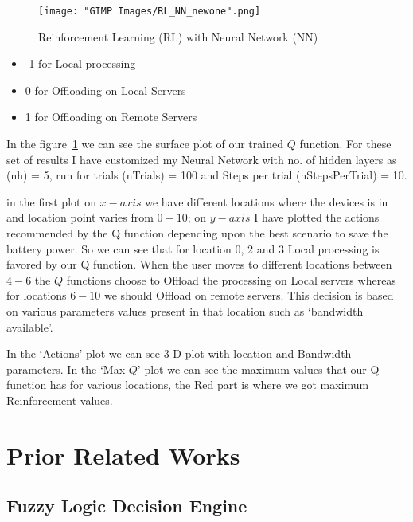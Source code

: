 \documentclass{report}
\begin{document}
\begin{figure}[h!]
  \centering
  \texttt{[image: "GIMP Images/RL\_NN\_newone".png]}
  \caption{Reinforcement Learning (RL) with Neural Network (NN)}
  \label{fig:RL_NN}
\end{figure}


\begin{itemize}
   \item -1 for Local processing
   \item 0 for Offloading on Local Servers
   \item 1 for Offloading on Remote Servers
\end{itemize}      



In the figure~\ref{fig:RL_NN} we can see the surface plot of our trained $Q$ function. For these set of results I have customized my Neural Network with no. of hidden layers as (nh) = 5, run for trials (nTrials) = 100 and Steps per trial (nStepsPerTrial) = 10. \par

in the first plot on $x-axis$ we have different locations where the devices is in and location point varies from $0-10$; on $y-axis$ I have plotted the actions recommended by the Q function depending upon the best scenario to save the battery power. So we can see that for location 0, 2 and 3 Local processing is favored by our Q function. When the user moves to different locations between $4-6$ the $Q$ functions choose to Offload the processing on Local servers whereas for locations $6-10$ we should Offload on remote servers. This decision is based on various parameters values present in that location such as `bandwidth available'. \par
In the `Actions' plot we can see 3-D plot with location and Bandwidth parameters. In the `Max $Q$' plot we can see the maximum values that our Q function has for various locations, the Red part is where we got maximum Reinforcement values. 

\chapter{Prior Related Works}
\label{chap:PriorRelatedWork}

\section{Fuzzy Logic Decision Engine}
\end{document}
